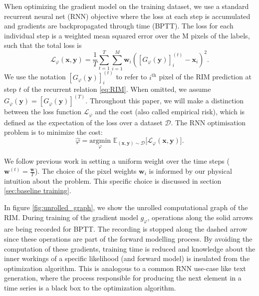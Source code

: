 \documentclass[twocolumn]{aastex631}
\begin{document}
When optimizing the gradient model on the training dataset, 
we use a standard recurrent neural net (RNN) objective
where the loss at each step is accumulated and gradients 
are backpropagated through time (BPTT). 
The loss for each individual step is a weighted mean squared error 
over the M pixels of the labels, such that the total loss is
\begin{equation}\label{eq:Loss}
        \mathcal{L}_\varphi(\mathbf{x}, \mathbf{y}) = 
        \frac{1}{T}\sum_{t=1}^{T}\sum_{i=1}^{M} \mathbf{w}_i ([G_\varphi(\mathbf{y})]^{(t)}_i - \mathbf{x}_i)^2.
\end{equation} 
We use the notation $[G_\varphi(\mathbf{y})]^{(t)}_i$ to refer to $i^{\text{th}}$ pixel of 
the RIM prediction 
at step $t$ of the recurrent relation \eqref{eq:RIM}. When omitted, 
we assume $G_\varphi(\mathbf{y}) = [G_\varphi(\mathbf{y})]^{(T)}$.
Throughout this 
paper, we will make a distinction 
between the loss function $\mathcal{L}_\varphi$
and the cost (also called empirical risk), 
which is defined as the 
expectation of the loss over a dataset $\mathcal{D}$.
The RNN optimisation problem is to minimize the cost:
\begin{equation}\label{eq:Cost} 
        \hat{\varphi} = \underset{\varphi}{\text{argmin}}\,\,
        \mathbb{E}_{(\mathbf{x},\mathbf{y}) \sim \mathcal{D}}\big[
        \mathcal{L}_\varphi(\mathbf{x}, \mathbf{y}) \big].
\end{equation} 

We follow previous work in setting a uniform weight over the time 
steps ($\mathbf{w}^{(t)} = \frac{\mathbf{w}}{T}$). 
The choice of the pixel weights $\mathbf{w}_i$ is informed 
by our physical intuition about the problem. This specific choice is discussed 
in section \ref{sec:baseline training}.

In figure \ref{fig:unrolled_graph}, we show the unrolled computational graph of the RIM. 
During training of the gradient model $g_\varphi$, operations along the solid arrows are being 
recorded for BPTT. The recording is stopped along the dashed arrow since these operations 
are part of the forward modelling process.
By avoiding the computation of these gradients, training time is reduced and 
knowledge about the inner workings  
of a specific likelihood (and forward model) is insulated from the optimization algorithm.
This is analogous to a common RNN use-case like text generation, where the process responsible 
for producing the next element in a time series is a black box to the optimization 
algorithm. 
\end{document}
